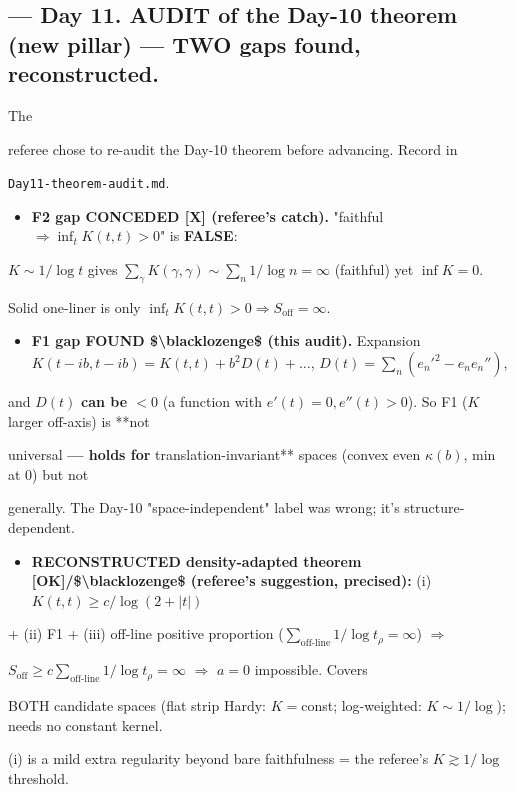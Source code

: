 \documentclass[10pt]{article}
\begin{document}
\subsection*{ --- Day 11. AUDIT of the Day-10 theorem (new pillar) --- TWO gaps found, reconstructed.}
The\par
referee chose to re-audit the Day-10 theorem before advancing. Record in\par
\texttt{Day11-theorem-audit.md}.\par
\begin{itemize}
\item \textbf{F2 gap CONCEDED [X] (referee's catch).} "faithful $\Rightarrow\inf_t K(t,t)>0$" is \textbf{FALSE}:
\end{itemize}
  $K\sim1/\log t$ gives $\sum_\gamma K(\gamma,\gamma)\sim\sum_n 1/\log n=\infty$ (faithful) yet $\inf K=0$.\par
  Solid one-liner is only \textbf{$\inf_t K(t,t)>0\Rightarrow S_{\mathrm{off}}=\infty$}.\par
\begin{itemize}
\item \textbf{F1 gap FOUND \$\textbackslash{}blacklozenge\$ (this audit).} Expansion $K(t-ib,t-ib)=K(t,t)+b^2 D(t)+\dots$, $D(t)=\sum_n(e_n'^2-e_ne_n'')$,
\end{itemize}
  and $D(t)$ \textbf{can be $<0$} (a function with $e'(t)=0,e''(t)>0$). So F1 ($K$ larger off-axis) is **not\par
  universal\textbf{ --- holds for }translation-invariant** spaces (convex even $\kappa(b)$, min at 0) but not\par
  generally. The Day-10 "space-independent" label was wrong; it's structure-dependent.\par
\begin{itemize}
\item \textbf{RECONSTRUCTED density-adapted theorem [OK]/\$\textbackslash{}blacklozenge\$ (referee's suggestion, precised):} (i) $K(t,t)\ge c/\log(2+|t|)$
\end{itemize}
  + (ii) F1 + (iii) off-line positive proportion ($\sum_{\text{off-line}}1/\log t_\rho=\infty$) $\Rightarrow$\par
  $S_{\mathrm{off}}\ge c\sum_{\text{off-line}}1/\log t_\rho=\infty$ $\Rightarrow$ $a=0$ impossible. Covers\par
  BOTH candidate spaces (flat strip Hardy: $K=$const; log-weighted: $K\sim1/\log$); needs no constant kernel.\par
  (i) is a mild extra regularity beyond bare faithfulness = the referee's $K\gtrsim1/\log$ threshold.\par
\end{document}
